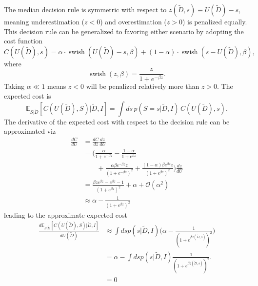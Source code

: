 \begin{example}
	The median decision rule is symmetric with respect to $z(\tilde{D},s) \equiv U(\tilde{D})-s$, meaning underestimation ($z<0$) and overestimation ($z>0$) is penalized equally. This decision rule can be generalized to favoring either scenario by adopting the cost function
	\begin{equation}
		C(U(\tilde{D}), s) = \alpha\cdot \operatorname{swish}(U(\tilde{D})-s,\beta)
		+(1-\alpha)\cdot \operatorname{swish}(s-U(\tilde{D}),\beta),
	\end{equation}
	where
	\begin{equation}
		\operatorname{swish}(z,\beta) = \frac{z}{1+e^{-\beta z}}.
	\end{equation}
	Taking $\alpha \ll 1$ means $z<0$ will be penalized relatively more than $z>0$. The expected cost is
	\begin{equation}
		\mathbb{E}_{S|\tilde{D}}[C(U(\tilde{D}), S)|\tilde{D},I] = \int ds \, p(S=s|\tilde{D},I)\, C(U(\tilde{D}),s).
	\end{equation}
	The derivative of the expected cost with respect to the decision rule can be approximated viz
	\begin{equation}
		\begin{split}
			\frac{dC}{dU} & = \frac{dC}{dz}\frac{dz}{dU}\\
			& = \bigg(\frac{\alpha}{1+e^{-\beta z}}-\frac{1-\alpha}{1+e^{\beta z}}\\
			&\qquad+\frac{\alpha\beta e^{-\beta z}z}{(1+e^{-\beta z})^2}+\frac{(1-\alpha)\beta e^{\beta z}z}{(1+e^{\beta z})^2}\bigg)\frac{dz}{dU}\\
			&= \frac{\beta z e^{\beta z}-e^{\beta z}-1}{(1+e^{\beta z})^2}+\alpha+\mathcal{O}(\alpha^2)\\
			&\approx  \alpha -\frac{1}{(1+e^{\beta z})^2}
		\end{split}
	\end{equation}
	leading to the approximate expected cost
	\begin{equation}
		\begin{split}
			\frac{d\mathbb{E}_{S|\tilde{D}}[C(U(\tilde{D}), S)|\tilde{D},I]}{dU(\tilde{D})} &\approx \int ds p(s|\tilde{D},I) \bigg(\alpha -\frac{1}{(1+e^{\beta z(\tilde{D},s)})^2}\bigg)\\
			& = \alpha -\int ds p(s|\tilde{D},I)\frac{1}{(1+e^{\beta z(\tilde{D},s)})^2}.\\
			& = 0
		\end{split}
	\end{equation}

\end{example}
